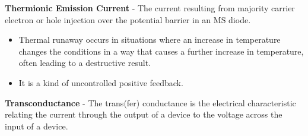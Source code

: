 \vspace{0.5cm}
    \textbf{Thermionic Emission Current} - The current resulting from majority carrier electron or hole injection over the potential barrier in an MS diode.
    \vspace{0.15cm}
    \begin{itemize}
        \setlength\itemsep{0.5em}
        \item{Thermal runaway occurs in situations where an increase in temperature changes the conditions in a way that causes a further increase in temperature, often leading to a destructive result.}
        \item{It is a kind of uncontrolled positive feedback.}
    \end{itemize}
\vspace{0.5cm}
    \textbf{Transconductance} - The trans(fer) conductance is the electrical characteristic relating the current through the output of a device to the voltage across the input of a device.
    \vspace{0.15cm}
